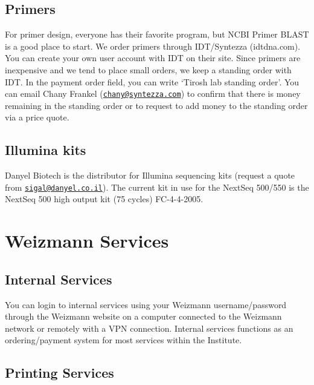 \documentclass[
]{book}
\begin{document}
\hypertarget{primers}{%
\section{Primers}\label{primers}}

For primer design, everyone has their favorite program, but NCBI Primer BLAST is a good place to start. We order primers through IDT/Syntezza (idtdna.com). You can create your own user account with IDT on their site. Since primers are inexpensive and we tend to place small orders, we keep a standing order with IDT. In the payment order field, you can write `Tirosh lab standing order'. You can email Chany Frankel (\href{mailto:chany@syntezza.com}{\nolinkurl{chany@syntezza.com}}) to confirm that there is money remaining in the standing order or to request to add money to the standing order via a price quote.

\hypertarget{illumina-kits}{%
\section{Illumina kits}\label{illumina-kits}}

Danyel Biotech is the distributor for Illumina sequencing kits (request a quote from \href{mailto:sigal@danyel.co.il}{\nolinkurl{sigal@danyel.co.il}}). The current kit in use for the NextSeq 500/550 is the NextSeq 500 high output kit (75 cycles) FC-4-4-2005.

\hypertarget{wisServices}{%
\chapter{Weizmann Services}\label{wisServices}}

\hypertarget{internal-services}{%
\section{Internal Services}\label{internal-services}}

You can login to internal services using your Weizmann username/password through the Weizmann website on a computer connected to the Weizmann network or remotely with a VPN connection. Internal services functions as an ordering/payment system for most services within the Institute.

\hypertarget{printing-services}{%
\section{Printing Services}\label{printing-services}}
\end{document}
